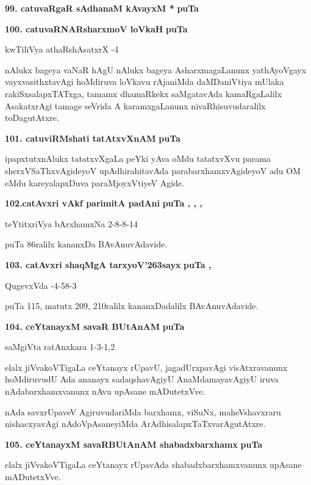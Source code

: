 \medskip
\noindent
\textbf{99. catuvaRgaR sAdhanaM kAvayxM *} \hfill{\bf puTa }

\medskip
\noindent
\textbf{100. catuvaRNARsharxmoV loVkaH} \hfill{\bf puTa }

\hfill{kwTiliVya athaRshAsatxrX -4}

\smallskip
nAlukx bageya vaNaR hAgU nAlukx bageya AsharxmagaLanunx yathAyoVgayx vayxvasithxtavAgi hoMdiruva loVkavu rAjaniMda daMDaniVtiya mUlaka rakiSxsalapxTATxga, tamamx dhamaRkekx saMgatavAda kamaRgaLalilx AsakatxrAgi tamage seVrida A karamxgaLanunx nivaRhisuvudaralilx toDagutAtxre.

\medskip
\noindent
\textbf{101. catuviRMshati tatAtxvXnAM} \hfill{\bf puTa }

\smallskip
ipapxtutxnAlukx tatatxvXgaLa peYki yAva oMdu tatatxvXvu parama sherxVSaThxvAgideyoV upAdhirahitavAda parabarxhamxvAgideyoV adu OM eMdu kareyalapxDuva paraMjoyxVtiyeV Agide.

\medskip
\noindent
\textbf{102.catAvxri vAkf parimitA padAni} \hfill{\bf puTa , , , }

\hfill{teYtitxriVya bArxhamxNa 2-8-8-14}

\smallskip
puTa 86ralilx kananxDa BAvAnuvAdavide.

\medskip
\noindent
\textbf{103. catAvxri shaqMgA tarxyoV\char'263sayx} \hfill{\bf puTa , }

\hfill{QugevxVda -4-58-3}

\smallskip
puTa 115, matutx 209, 210ralilx kananxDadalilx BAvAnuvAdavide.

\medskip
\noindent
\textbf{104. ceYtanayxM savaR BUtAnAM} \hfill{\bf puTa }

\hfill{saMgiVta ratAnxkara 1-3-1,2}

\smallskip
elalx jiVvakoVTigaLa ceYtanayx rUpavU, jagadUrxpavAgi visAtxravanunx hoMdiruvudU Ada ananayx sadaqshavAgiyU AnaMdamayavAgiyU iruva nAdabarxhamxvanunx nAvu upAsane mADutetxVve.

nAda savxrUpaveV AgiruvudariMda barxhamx, viSuNx, maheVshavxraru nishacxyavAgi nAdoVpAsaneyiMda ArAdhisalapxTaTxvarAgutAtxre.

\medskip
\noindent
\textbf{105. ceYtanayxM savaRBUtAnAM shabadxbarxhamx} \hfill{\bf puTa }

\smallskip
elalx jiVvakoVTigaLa ceYtanayx rUpavAda shabadxbarxhamxvanunx upAsane mADutetxVve.

